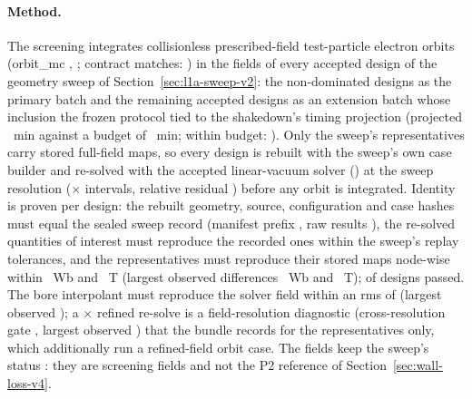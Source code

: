 \paragraph{Method.}
The screening integrates collisionless prescribed-field test-particle electron
orbits (orbit\_mc \WlgOrbitMcVersion, \texttt{\WlgBackend}; contract matches:
\WlgOrbitMcContractMatches) in the fields of every accepted design of the geometry
sweep of Section~\ref{sec:l1a-sweep-v2}: the \WlgPrimaryCount{} non-dominated designs
as the primary batch and the remaining \WlgExtensionCount{} accepted designs as an
extension batch whose inclusion the frozen protocol tied to the shakedown's timing
projection (projected \WlgTimingProjectedMin{}~min against a budget of
\WlgTimingBudgetMin{}~min; within budget: \WlgTimingWithinBudget). Only the sweep's
\WlgRepresentativeCount{} representatives carry stored full-field maps, so every
design is rebuilt with the sweep's own case builder and re-solved with the accepted
linear-vacuum \WlgFieldModelLevel{} solver (\texttt{\WlgResolveSolver}) at the sweep
resolution (\WlgGridRadial$\times$\WlgGridAxial{} intervals, relative residual
\WlgSolverRelTol) before any orbit is integrated. Identity is proven per design:
the rebuilt geometry, source, configuration and case hashes must equal the sealed
sweep record (manifest prefix \texttt{\WlgSweepManifestSha}, raw results
\texttt{\WlgSweepRawSha}), the re-solved quantities of interest must reproduce the
recorded ones within the sweep's replay tolerances, and the representatives must
reproduce their stored maps node-wise within \WlgStoredPsiTol{}~Wb and
\WlgStoredBTol{}~T (largest observed differences \WlgStoredPsiMaxDiff{}~Wb and
\WlgStoredBMaxDiff{}~T); \WlgIdentityProvenDesigns{} of \WlgDesignCount{} designs
passed. The bore interpolant must reproduce the solver field within an rms of
\WlgInterpolationGate{} (largest observed \WlgInterpolationRmsMax); a
\WlgRefinement$\times$ refined re-solve is a field-resolution diagnostic
(cross-resolution gate \WlgCrossResolutionGate, largest observed
\WlgCrossResolutionRmsMax) that the bundle records for the
\WlgCrossResolutionDesigns{} representatives only, which additionally run a
refined-field orbit case. The fields keep the sweep's status
\texttt{\WlgFieldStatus}: they are screening fields and not the P2 reference of
Section~\ref{sec:wall-loss-v4}.

